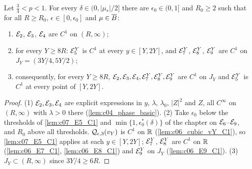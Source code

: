 \begin{lemma}
  \label{lem:c04_residual_terms_C1}
  Let $\frac34<p<1$. For every $\delta\in(0,|\mu_*|/2]$ there are $\epsilon_0\in(0,1]$ and $R_0\ge2$ such that for all
  $R\ge R_0$, $\epsilon\in[0,\epsilon_0]$ and $\mu\in\overline{B}$:
  \begin{enumerate}
    \item $\mathcal{E}_2$, $\mathcal{E}_3$, $\mathcal{E}_4$ are $C^1$ on $(R,\infty)$;
    \item for every $Y\ge8R$: $\mathcal{E}_5^Y$ is $C^1$ at every $y\in[Y,2Y]$, and $\mathcal{E}_7^Y$, $\mathcal{E}_8^Y$, $\mathcal{E}_9^Y$ are $C^1$
      on $J_Y=(3Y/4,5Y/2)$;
    \item consequently, for every $Y\ge8R$, $\mathcal{E}_2,\mathcal{E}_3,\mathcal{E}_4,\mathcal{E}_7^Y,\mathcal{E}_8^Y,\mathcal{E}_9^Y$ are $C^1$ on $J_Y$ and
      $\mathcal{E}_5^Y$ is $C^1$ at every point of $[Y,2Y]$.
  \end{enumerate}
\end{lemma}
\begin{proof}
  (1) $\mathcal{E}_2,\mathcal{E}_3,\mathcal{E}_4$ are explicit expressions in $y$, $\lambda$, $\lambda_0$, $|Z|^2$ and $Z$, all $C^\infty$ on
  $(R,\infty)$ with $\lambda>0$ there (\cref{lem:c04_phase_basic}).
  (2) Take $\epsilon_0$ below the thresholds of \cref{lem:c07_E5_C1} and $\min\{1,\epsilon_0^*(\delta)\}$ of the chapter on
  $\mathcal{E}_6$--$\mathcal{E}_9$, and $R_0$ above all thresholds. $\mathcal{Q}_{\epsilon,3}(v_Y)$ is $C^1$ on $\mathbb{R}$
  (\cref{lem:c06_cubic_vY_C1}), so \cref{lem:c07_E5_C1} applies at each $y\in[Y,2Y]$; $\mathcal{E}_7^Y$, $\mathcal{E}_8^Y$ are $C^1$ on
  $\mathbb{R}$ (\cref{lem:c06_E7_C1}, \cref{lem:c06_E8_C1}) and $\mathcal{E}_9^Y$ on $J_Y$ (\cref{lem:c06_E9_C1}).
  (3) $J_Y\subset(R,\infty)$ since $3Y/4\ge6R$.
\end{proof}


